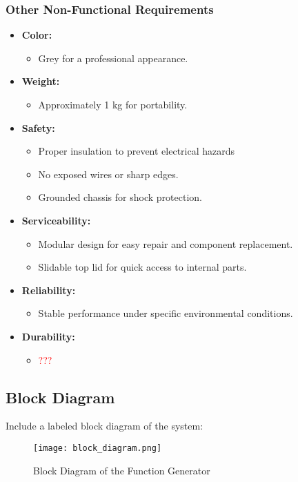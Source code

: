 \documentclass[a4paper,12pt]{article}
\begin{document}
\subsubsection{Other Non-Functional Requirements
}
\begin{itemize}
    \item \textbf{Color:}
    \begin{itemize}
        \item Grey for a professional appearance.
    \end{itemize}
    \item \textbf{Weight:}
    \begin{itemize}
        \item Approximately 1 kg for portability.
    \end{itemize}
    \item \textbf{Safety:}
    \begin{itemize}
        \item Proper insulation to prevent electrical hazards
        \item No exposed wires or sharp edges.
        \item Grounded chassis for shock protection.
    \end{itemize}
    \item \textbf{Serviceability:}
    \begin{itemize}
        \item Modular design for easy repair and component replacement.
        \item Slidable top lid for quick access to internal parts.
    \end{itemize}
    \item \textbf{Reliability:}
    \begin{itemize}
        \item Stable performance under specific environmental conditions.
    \end{itemize}
    \item \textbf{Durability:}
    \begin{itemize}
        \item \textcolor{red}{???}
    \end{itemize}
\end{itemize}


\subsection{Block Diagram}
Include a labeled block diagram of the system:
\begin{figure}[H]
    \centering
    \texttt{[image: block\_diagram.png]} %
    \caption{Block Diagram of the Function Generator}
    \label{fig:block_diagram}
\end{figure}
\end{document}

